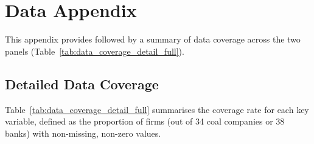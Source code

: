 
\section{Data Appendix}
\label{sec:appendix_data}

This appendix provides followed by a summary of data coverage across the two panels (Table~\ref{tab:data_coverage_detail_full}).


\subsection{Detailed Data Coverage}
\label{subsec:data_coverage_detail}

Table~\ref{tab:data_coverage_detail_full} summarises the coverage rate for each key variable, defined as the proportion of firms (out of 34 coal companies or 38 banks) with non-missing, non-zero values.


